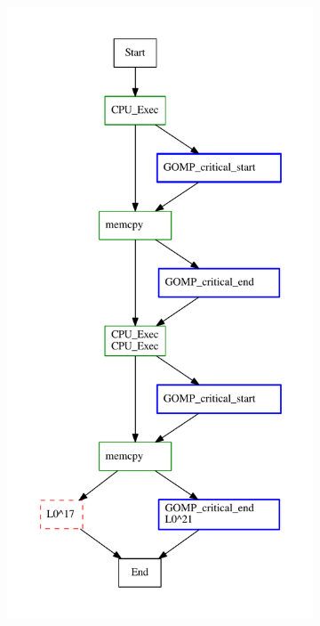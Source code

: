 

\newpage

\newpage



\begin{figure}[]
     \centering
     \begin{subfigure}[b]{0.31\textwidth}
        \centering
\includegraphics[width=\textwidth]{diffTrace/figs/diffNLR/ompBug-6-4-x0.pdf}

\end{subfigure}
\end{figure}
